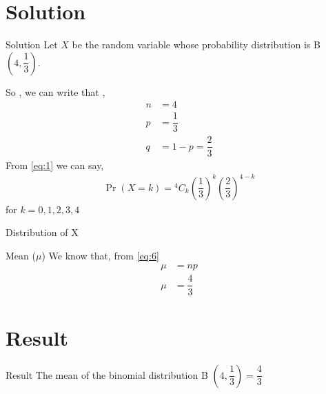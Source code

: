 \documentclass{beamer}
\providecommand{\pr}[1]{\ensuremath{\Pr\left(#1\right)}}
\newcommand*{\Comb}[2]{{}^{#1}C_{#2}}
\providecommand{\brak}[1]{\ensuremath{\left(#1\right)}}
\begin{document}
    \section{Solution}
    \begin{frame}{Solution}
    Let $X$ be the random variable whose probability distribution is B \brak{4,\dfrac{1}{3}}.
    
    So , we can write that ,
    \begin{align}
        n &=4 \\
        p &= \dfrac{1}{3} \\
        q &= 1- p = \dfrac{2}{3}
    \end{align}
    From \eqref{eq:1} we can say,
    \begin{align}
        \pr{X = k} = \Comb{4}{k} \brak{\dfrac{1}{3}}^k\brak{\dfrac{2}{3}}^{4-k}
    \end{align}
    for $k = 0,1,2,3,4$
    \end{frame}
    
    \begin{frame}{Distribution of X}
    \begin{table}[ht!]
    \def\arraystretch{1.53}
        
        \caption{Probability Distribution of X}
        \label{Table1}
    \end{table}
    \end{frame}
    
    \begin{frame}{Mean ($\mu$)}
    We know that, from \eqref{eq:6}
        \begin{align}
            \mu &= np \\
            \mu &= \dfrac{4}{3}
        \end{align}
    \end{frame}
    
    \section{Result}
    \begin{frame}{Result}
        The mean of the binomial distribution B $\brak{4,\dfrac{1}{3}} = \dfrac{4}{3}$
    \end{frame}
\end{document}
